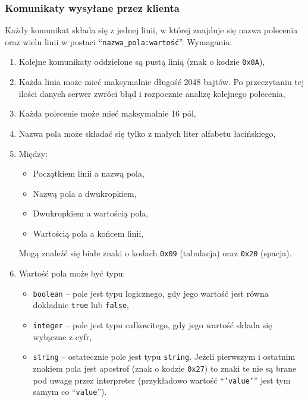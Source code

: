 \documentclass[10pt,a4paper]{article}
\newcommand{\quotes}[1]{``#1''}
\begin{document}
\subsubsection{Komunikaty wysyłane przez klienta}
Każdy komunikat składa się z jednej linii, w której znajduje się nazwa polecenia oraz wielu linii w postaci \quotes{\texttt{nazwa\_pola:wartość}}. Wymagania:
\begin{enumerate}
    \item Kolejne komunikaty oddzielone są pustą linią (znak o kodzie \texttt{0x0A}),
    \item Każda linia może mieć maksymalnie długość 2048 bajtów. Po przeczytaniu tej ilości danych serwer zwróci błąd i rozpocznie analizę kolejnego polecenia,
    \item Każda polecenie może mieć maksymalnie 16 pól,
    \item Nazwa pola może składać się tylko z małych liter alfabetu łacińskiego,
    \item Między:
        \begin{itemize}
            \item Początkiem linii a nazwą pola,
            \item Nazwą pola a dwukropkiem,
            \item Dwukropkiem a wartością pola,
            \item Wartością pola a końcem linii,
        \end{itemize}
        Mogą znaleźć się białe znaki o kodach \texttt{0x09} (tabulacja) oraz \texttt{0x20} (spacja).
    \item Wartość pola może być typu:
        \begin{itemize}
            \item \texttt{boolean} -- pole jest typu logicznego, gdy jego wartość jest równa dokładnie \texttt{true} lub \texttt{false},
            \item \texttt{integer} -- pole jest typu całkowitego, gdy jego wartość składa się wyłączne z cyfr,
            \item \texttt{string} -- ostatecznie pole jest typu \texttt{string}. Jeżeli pierwszym i ostatnim znakiem pola jest apostrof (znak o kodzie \texttt{0x27}) to znaki te nie są brane pod uwagę przez interpreter (przykładowo wartość \quotes{\texttt{'value'}} jest tym samym co \quotes{\texttt{value}}).
        \end{itemize}
\end{enumerate}
\end{document}
